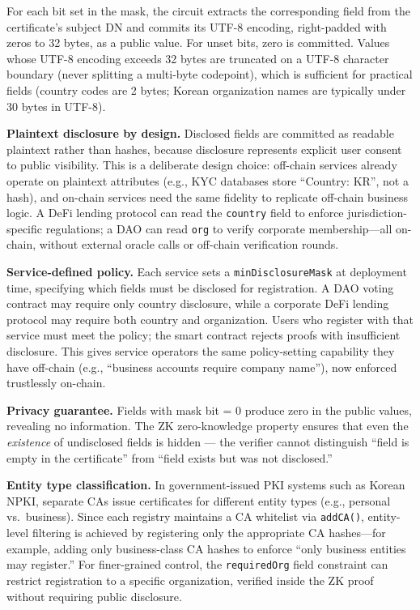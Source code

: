 \documentclass[11pt, a4paper]{article}
\begin{document}
For each bit set in the mask, the circuit extracts the corresponding
field from the certificate's subject DN and commits its UTF-8 encoding,
right-padded with zeros to 32 bytes, as a public value. For unset bits,
zero is committed. Values whose UTF-8 encoding exceeds 32 bytes are
truncated on a UTF-8 character boundary (never splitting a multi-byte
codepoint), which is sufficient for practical fields (country codes are
2 bytes; Korean organization names are typically under 30 bytes in
UTF-8).

\textbf{Plaintext disclosure by design.} Disclosed fields are committed
as readable plaintext rather than hashes, because disclosure represents
explicit user consent to public visibility. This is a deliberate design
choice: off-chain services already operate on plaintext attributes
(e.g., KYC databases store ``Country: KR'', not a hash), and on-chain
services need the same fidelity to replicate off-chain business logic.
A DeFi lending protocol can read the \texttt{country} field to enforce
jurisdiction-specific regulations; a DAO can read \texttt{org} to verify
corporate membership---all on-chain, without external oracle calls or
off-chain verification rounds.

\textbf{Service-defined policy.} Each service sets a
\texttt{minDisclosureMask} at deployment time, specifying which fields
must be disclosed for registration. A DAO voting contract may require
only country disclosure, while a corporate DeFi lending protocol may
require both country and organization. Users who register with that
service must meet the policy; the smart contract rejects proofs with
insufficient disclosure. This gives service operators the same
policy-setting capability they have off-chain (e.g., ``business accounts
require company name''), now enforced trustlessly on-chain.

\textbf{Privacy guarantee.} Fields with mask bit = 0 produce zero
in the public values, revealing no information. The ZK zero-knowledge
property ensures that even the \emph{existence} of undisclosed fields is
hidden --- the verifier cannot distinguish ``field is empty in the
certificate'' from ``field exists but was not disclosed.''

\textbf{Entity type classification.} In government-issued PKI systems
such as Korean NPKI, separate CAs issue certificates for different
entity types (e.g., personal vs.\ business). Since each registry
maintains a CA whitelist via \texttt{addCA()}, entity-level filtering
is achieved by registering only the appropriate CA hashes---for example,
adding only business-class CA hashes to enforce ``only business entities
may register.'' For finer-grained control, the \texttt{requiredOrg}
field constraint can restrict registration to a specific organization,
verified inside the ZK proof without requiring public disclosure.
\end{document}
